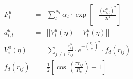 \documentclass[12pt]{article}
\begin{document}
\begin{eqnarray*}
  F_i^u & = & \sum_t^{N_t}\alpha_t \cdot \exp\left[-\frac{\left(d_{i,t}^u\right)^2}{2l^2}\right] \\
  d_{i,t}^u & = & \left|\left| V_i^u(\eta) - V_t^u(\eta) \right|\right| \\
  V_i^u(\eta) & = & \sum_{j \neq i}\frac{r^u_{ij}}{r_{ij}} \cdot e^{-\left(\frac{r_{ij}}{\eta} \right)^2} \cdot f_d\left(r_{ij}\right) \\
  f_d\left(r_{ij}\right) & = & \frac{1}{2} \left[\cos\left(\frac{\pi r_{ij}}{R_c}\right) + 1 \right]
\end{eqnarray*}
\end{document}
